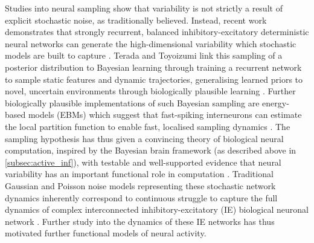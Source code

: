 Studies into neural sampling show that variability is not strictly a result of explicit stochastic noise, as traditionally believed. Instead, recent work demonstrates that strongly recurrent, balanced inhibitory-excitatory deterministic neural networks can generate the high-dimensional variability which stochastic models are built to capture \cite{terada_chaotic_2024, NIPS2002_a486cd07}. Terada and Toyoizumi link this sampling of a posterior distribution to Bayesian learning through training a recurrent network to sample static features and dynamic trajectories, generalising learned priors to novel, uncertain environments through biologically plausible learning \cite{terada_chaotic_2024}. Further biologically plausible implementations of such Bayesian sampling are energy-based models (EBMs) which suggest that fast-spiking interneurons can estimate the local partition function to enable fast, localised sampling dynamics \cite{dong_neural_nodate}. The sampling hypothesis has thus given a convincing theory of biological neural computation, inspired by the Bayesian brain framework (as described above in \ref{subsec:active_inf}), with testable and well-supported evidence that neural variability has an important functional role in computation \cite{orban_neural_2016, ujfalussy_sampling_2022}. Traditional Gaussian and Poisson noise models representing these stochastic network dynamics inherently correspond to continuous struggle to capture the full dynamics of complex interconnected inhibitory-excitatory (IE) biological neuronal network \cite{koren_efficient_2025, kilgore_biologically-informed_2025, song_training_2016}. Further study into the dynamics of these IE networks has thus motivated further functional models of neural activity.

